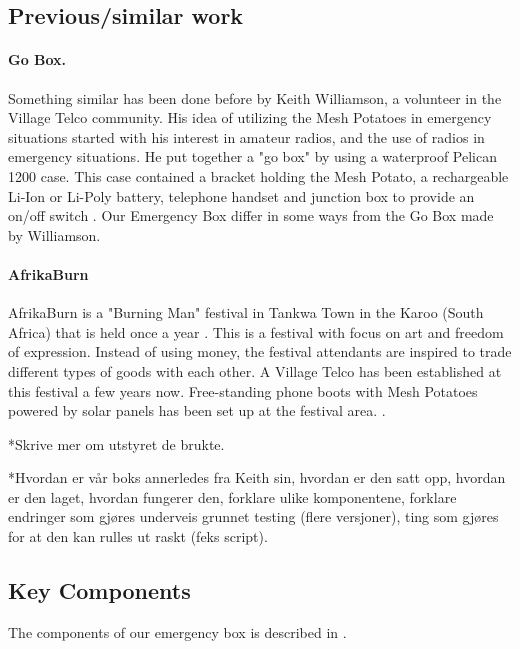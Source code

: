 \subsection{Previous/similar work}
\paragraph{Go Box.} Something similar has been done before by Keith Williamson, a volunteer in the Village Telco community. His idea of utilizing the Mesh Potatoes in emergency situations started with his interest in amateur radios, and the use of radios in emergency situations. He put together a "go box" by using a waterproof Pelican 1200 case. This case contained a bracket holding the Mesh Potato, a rechargeable Li-Ion or Li-Poly battery, telephone handset and junction box to provide an on/off switch \cite{keith}. Our Emergency Box differ in some ways from the Go Box made by Williamson. 

\paragraph{AfrikaBurn}
AfrikaBurn is a "Burning Man" festival in Tankwa Town in the Karoo (South Africa) that is held once a year \cite{whatisafrikaburn}. This is a festival with focus on art and freedom of expression. Instead of using money, the festival attendants are inspired to trade different types of goods with each other. A Village Telco has been established at this festival a few years now. Free-standing phone boots with Mesh Potatoes powered by solar panels has been set up at the festival area.  \cite{africaburnforavillagetelco,africaburnsagainforavillagetelco}. 

*Skrive mer om utstyret de brukte.


*Hvordan er vår boks annerledes fra Keith sin, hvordan er den satt opp, hvordan er den laget, hvordan fungerer den, forklare ulike komponentene, forklare endringer som gjøres underveis grunnet testing (flere versjoner), ting som gjøres for at den kan rulles ut raskt (feks script). 

\subsection{Key Components}
The components of our emergency box is described in . 

